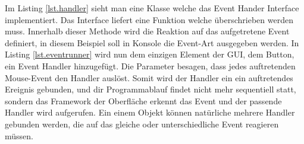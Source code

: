 

Im Listing \ref{lst.handler} sieht man eine Klasse welche das Event Hander Interface implementiert. Das Interface liefert eine Funktion welche überschrieben werden muss. Innerhalb dieser Methode wird die Reaktion auf das aufgetretene Event definiert, in diesem Beispiel soll in Konsole die Event-Art ausgegeben werden. In Listing \ref{lst.eventrunner} wird nun dem einzigen Element der GUI, dem Button, ein Event Handler hinzugefügt. Die Parameter besagen, dass jedes auftretenden Mouse-Event den Handler auslöst. Somit wird der Handler ein ein auftretendes Ereignis gebunden, und dir Programmablauf findet nicht mehr sequentiell statt, sondern das Framework der Oberfläche erkennt das Event und der passende Handler wird aufgerufen. Ein einem Objekt können natürliche mehrere Handler gebunden werden, die auf das gleiche oder unterschiedliche Event reagieren müssen.



